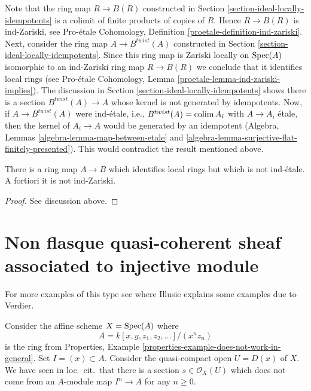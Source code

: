 \noindent
Note that the ring map $R \to B(R)$ constructed in
Section \ref{section-ideal-locally-idempotents} is
a colimit of finite products of copies of $R$. Hence $R \to B(R)$
is ind-Zariski, see
Pro-\'etale Cohomology, Definition \ref{proetale-definition-ind-zariski}.
Next, consider the ring map $A \to B^{twist}(A)$
constructed in Section \ref{section-ideal-locally-idempotents}.
Since this ring map is Zariski locally on $\mathop{\mathrm{Spec}}(A)$ isomorphic to an
ind-Zariski ring map $R \to B(R)$ we conclude that it identifies local rings
(see Pro-\'etale Cohomology, Lemma \ref{proetale-lemma-ind-zariski-implies}).
The discussion in Section \ref{section-ideal-locally-idempotents}
shows there is a section
$B^{twist}(A) \to A$ whose kernel is not generated by idempotents.
Now, if $A \to B^{twist}(A)$ were ind-\'etale, i.e.,
$B^{twist}(A) = \mathop{\mathrm{colim}}\nolimits A_i$ with $A \to A_i$ \'etale,
then the kernel of $A_i \to A$ would be generated by an idempotent
(Algebra, Lemmas \ref{algebra-lemma-map-between-etale} and
\ref{algebra-lemma-surjective-flat-finitely-presented}).
This would contradict the result mentioned above.

\begin{lemma}
\label{lemma-not-ind-etale}
There is a ring map $A \to B$ which identifies local rings but
which is not ind-\'etale. A fortiori it is not ind-Zariski.
\end{lemma}

\begin{proof}
See discussion above.
\end{proof}




\section{Non flasque quasi-coherent sheaf associated to injective module}
\label{section-nonflasque}

\noindent
For more examples of this type see \cite[Expos\'e II, Appendix I]{SGA6}
where Illusie explains some examples due to Verdier.

\medskip\noindent
Consider the affine scheme $X = \mathop{\mathrm{Spec}}(A)$ where
$$
A = k[x, y, z_1, z_2, \ldots]/(x^nz_n)
$$
is the ring from
Properties, Example \ref{properties-example-does-not-work-in-general}.
Set $I = (x) \subset A$. Consider the quasi-compact open $U = D(x)$ of $X$.
We have seen in loc.\ cit.\ that there is a section
$s \in \mathcal{O}_X(U)$ which does not come from an $A$-module
map $I^n \to A$ for any $n \geq 0$.

